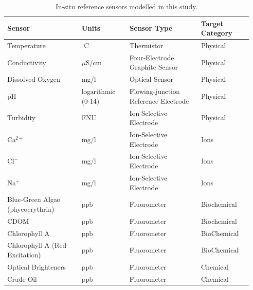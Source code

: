 \documentclass[journal,article,submit,pdftex,moreauthors]{Definitions/mdpi}
\begin{document}
\begin{table}[H] 
\caption{In-situ reference sensors modelled in this study.\label{tab:sensors}}
\begin{tabularx}{\textwidth}{CCCC}
\toprule
\textbf{Sensor}	& \textbf{Units} & \textbf{Sensor Type} & \textbf{Target Category}\\
\midrule
Temperature		                    & $^{\circ}$C       & Thermistor  & Physical \\
Conductivity                        & $\mu$S/cm         & Four-Electrode Graphite Sensor & Physical  \\
Dissolved Oxygen                    & mg/l              & Optical Sensor & Physical \\
pH                                  & logarithmic (0-14)& Flowing-junction Reference Electrode & Physical \\
Turbidity                           & FNU               & Ion-Selective Electrode  & Physical \\
$\mathrm{Ca^{2+}}$                  & mg/l              & Ion-Selective Electrode  & Ions \\
$\mathrm{Cl^-}$                     & mg/l              & Ion-Selective Electrode & Ions \\
$\mathrm{Na^+}$                     & mg/l              & Ion-Selective Electrode & Ions \\
Blue-Green Algae (phycoerythrin)    & ppb               & Fluorometer & Biochemical \\
CDOM                                & ppb               & Fluorometer & Biochemical \\
Chlorophyll A                       & ppb               & Fluorometer & BioChemical \\
Chlorophyll A (Red Excitation)      & ppb               & Fluorometer & BioChemical\\
Optical Brighteners                 & ppb               & Fluorometer & Chemical \\
Crude Oil                           & ppb               & Fluorometer & Chemical\\
\bottomrule
\end{tabularx}
\end{table}
\end{document}
